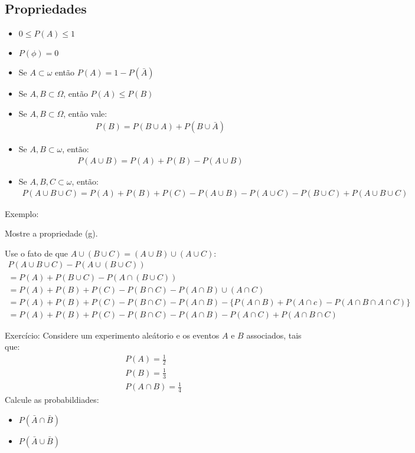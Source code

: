 \documentclass[11pt,a4paper]{book}
\begin{document}
\begin{enumerate}[label=(\alph*)]
\begin{enumerate}
\subsection{Propriedades}
\begin{itemize}
  \item $0 \le P(A) \le 1$
  \item $P(\phi)=0$
  \item Se $A \subset \omega$ então $P(A)=1-P(\bar{A})$
  \item Se $A,B \subset \Omega$, então $P(A) \le P(B)$
  \item Se $A,B \subset \Omega$, então vale:
    \begin{align}
      P(B)= P(B\cup A)+ P(B\cup \bar{A})
    \end{align}
  \item Se $A,B \subset \omega$, então:
    \begin{align}
      P(A\cup B)= P(A)+P(B)-P(A\cup B)
    \end{align}
  \item Se $A,B,C \subset \omega$, então:
    \begin{align}
      P(A\cup B \cup C)= P(A)+P(B)+P(C)-P(A \cup B)- P(A \cup C)-
      P(B\cup C)+P(A\cup B \cup C)
    \end{align}
\end{itemize}
Exemplo: 

Mostre a propriedade (g).

Use o fato de que $A\cup (B \cup C )= (A\cup B )\cup (A \cup C )$:
\begin{align}
  P(A\cup B\cup C)- P(A \cup (B \cup C) )\\
  =P(A)+P(B\cup C)- P(A\cap(B\cup C) )\\
  =P(A)+P(B)+P(C)-P(B\cap C)- P(A \cap B)\cup (A \cap C)\\
  =P(A)+P(B)+P(C)-P(B\cap C)- P(A \cap B)-\big\{ P(A \cap B)+ P(A \cap c)-P(A \cap B \cap A \cap C)\big\}\\
  =P(A)+P(B)+P(C)-P(B\cap C)- P(A \cap B)- P(A \cap C)+ P(A \cap B \cap C)
\end{align}

Exercício: Considere um experimento aleátorio e os eventos $A$ e $B$ associados, tais que:
\begin{align*}
  P(A)= \frac{1}{2}\\
  P(B)= \frac{1}{3}\\
  P(A \cap B)= \frac{1}{4}
\end{align*}
Calcule as probabildiades:
\begin{itemize}
  \item $ P(\bar{A} \cap \bar{B})$
  \item $P(\bar{A} \cup \bar{B})$
\end{itemize}

\end{enumerate}
\end{enumerate}
\end{document}
